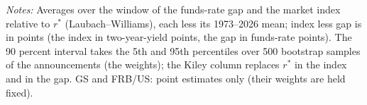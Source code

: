 \begin{table}[tbp]\centering\small
\caption{The Index Relative to the Funds-Rate Gap in Three Episodes and Today}\label{tab:stancepisodes}
\begin{flushleft}\footnotesize\textit{Notes:} Averages over the window of the funds-rate gap and the market index relative to $r^*$ (Laubach--Williams), each less its 1973--2026 mean; index less gap is in points (the index in two-year-yield points, the gap in funds-rate points). The 90 percent interval takes the 5th and 95th percentiles over 500 bootstrap samples of the announcements (the weights); the Kiley column replaces $r^*$ in the index and in the gap. GS and FRB/US: point estimates only (their weights are held fixed).\end{flushleft}
\end{table}
